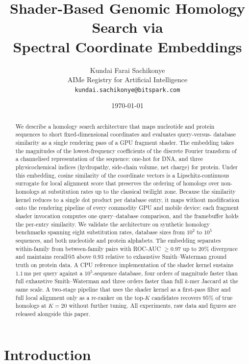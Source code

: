 \documentclass[twocolumn,11pt,a4paper]{article}
\title{\textbf{Shader-Based Genomic Homology Search via\\ Spectral Coordinate Embeddings}}
\author{
Kundai Farai Sachikonye\\[0.2em]
AIMe Registry for Artificial Intelligence\\[0.2em]
\texttt{kundai.sachikonye@bitspark.com}
}
\date{\today}
\theoremstyle{definition}
\theoremstyle{remark}
\begin{document}
\maketitle

\begin{abstract}
\noindent
We describe a homology search architecture that maps nucleotide and protein
sequences to short fixed-dimensional coordinates and evaluates query-versus-
database similarity as a single rendering pass of a GPU fragment shader. The
embedding takes the magnitudes of the lowest-frequency coefficients of the
discrete Fourier transform of a channelised representation of the sequence:
one-hot for DNA, and three physicochemical indices (hydropathy, side-chain
volume, net charge) for protein. Under this embedding, cosine similarity of
the coordinate vectors is a Lipschitz-continuous surrogate for local alignment
score that preserves the ordering of homologs over non-homologs at substitution
rates up to the classical twilight zone. Because the similarity kernel reduces
to a single dot product per database entry, it maps without modification onto
the rendering pipeline of every commodity GPU and mobile device: each fragment
shader invocation computes one query--database comparison, and the
framebuffer holds the per-entry similarity. We validate the architecture on
synthetic homology benchmarks spanning eight substitution rates, database
sizes from $10^2$ to $10^5$ sequences, and both nucleotide and protein
alphabets. The embedding separates within-family from between-family pairs
with ROC-AUC $\geq 0.97$ up to $20\%$ divergence and maintains recall@5 above
$0.93$ relative to exhaustive Smith--Waterman ground truth on protein data.
A CPU reference implementation of the shader kernel sustains
$1.1\,\mathrm{ms}$ per query against a $10^5$-sequence database, four orders
of magnitude faster than full exhaustive Smith--Waterman and three orders
faster than full $k$-mer Jaccard at the same scale. A two-stage pipeline that
uses the shader kernel as a first-pass filter and full local alignment only
as a re-ranker on the top-$K$ candidates recovers $95\%$ of true homologs at
$K=20$ without further tuning. All experiments, raw data and figures are
released alongside this paper.
\end{abstract}

\tableofcontents

\section{Introduction}
\label{sec:intro}
\end{document}
